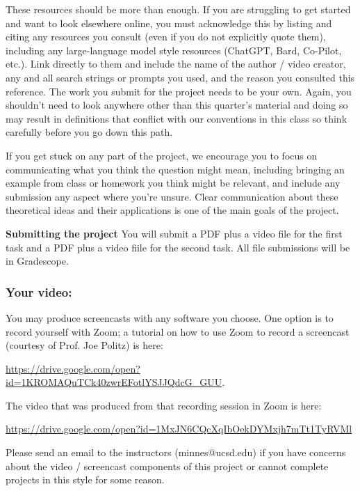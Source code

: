 These resources should be more than enough.
If you are struggling to get started and want to look elsewhere online, 
you must acknowledge this by listing and citing any resources you consult 
(even if you do not explicitly quote them), including any large-language model style resources (ChatGPT, Bard, Co-Pilot, etc.). 
Link directly to them and include the name of the author / video creator, 
any and all search strings or prompts you used, and the reason you consulted this reference. The work you submit for the project needs to be your own. Again, you shouldn't need to look anywhere 
other than this quarter's material and doing so may result in definitions that
conflict with our conventions in this class so think carefully before you go down this path.

If you get stuck on any part of the project, we encourage you to focus on communicating what you think 
the question might mean, including bringing an example from class or homework you think might be relevant, and 
include any submission any aspect where you're unsure. Clear communication about these
theoretical ideas and their applications is one of the main goals of the project.

{\bf Submitting the project} You will submit a PDF plus a video file for the first task and a PDF plus a video fiile for the 
second task. All file submissions will be in Gradescope.

\newpage
\subsubsection*{Your video:} You may produce screencasts 
with any software you choose. 
One option is to record yourself with Zoom; a tutorial on how to use 
Zoom to record a 
screencast (courtesy of Prof. Joe Politz)  is here: 

\url{https://drive.google.com/open?id=1KROMAQuTCk40zwrEFotlYSJJQdcG_GUU}.

The video that was produced from that recording session in Zoom is here:

\url{https://drive.google.com/open?id=1MxJN6CQcXqIbOekDYMxjh7mTt1TyRVMl}

Please send an email to the instructors 
(minnes@ucsd.edu) if you have 
concerns about  the video / screencast components of this project or 
cannot complete projects in this style for some reason.


